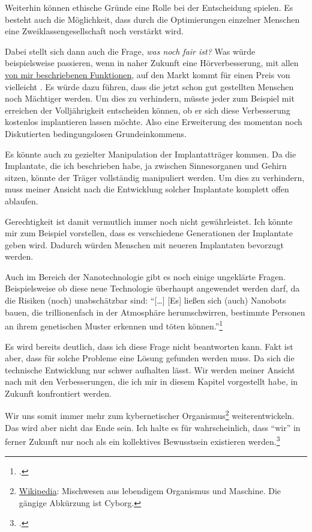Weiterhin können ethische Gründe eine Rolle bei der Entscheidung spielen. Es besteht auch die
Möglichkeit, dass durch die Optimierungen einzelner Menschen eine Zweiklassengesellschaft noch
verstärkt wird.

Dabei stellt sich dann auch die Frage, \emph{was noch fair ist?} Was würde beispielsweise passieren,
wenn in
naher Zukunft eine Hörverbesserung, mit allen \hyperref[sec:Robin:future:hearing]{von mir
beschriebenen Funktionen}, auf den Markt kommt für einen Preis von vielleicht . Es würde
dazu führen, dass die jetzt schon gut gestellten Menschen noch Mächtiger werden. Um dies zu
verhindern, müsste jeder zum Beispiel mit erreichen der Volljährigkeit entscheiden können, ob er sich
diese Verbesserung kostenlos implantieren lassen möchte. Also eine Erweiterung des momentan noch
Diskutierten bedingungslosen Grundeinkommens.

\begin{comment}
Eine weitere Frage ist, bis wann wir noch als Menschen zählen?
„Ist man noch ein Mensch, wenn man den Teil im Gehirn abgeschaltet hat, der für Schuldgefühle
zuständig ist?“\footcite{23C3:body_hacking}
\end{comment}

Es könnte auch zu gezielter Manipulation der Implantatträger kommen. Da die Implantate, die ich
beschrieben habe, ja zwischen Sinnesorganen und Gehirn sitzen, könnte der Träger vollständig
manipuliert werden. Um dies zu verhindern, muss meiner Ansicht nach die Entwicklung solcher
Implantate komplett offen ablaufen.

Gerechtigkeit ist damit vermutlich immer noch nicht gewährleistet. Ich könnte mir zum Beispiel
vorstellen, dass es verschiedene Generationen der Implantate geben wird. Dadurch würden Menschen mit
neueren Implantaten bevorzugt werden.

Auch im Bereich der Nanotechnologie gibt es noch einige ungeklärte Fragen. Beispielsweise ob diese
neue Technologie überhaupt angewendet werden darf, da die Risiken (noch) unabschätzbar sind:
\enquote{[\dots] [Es] ließen sich (auch) Nanobots bauen, die trillionenfach in der Atmosphäre
herumschwirren, bestimmte Personen an ihrem genetischen Muster erkennen und töten
können.}\footcite[13]{Heise:Telepolis:Mensch:Unsterblichkeit}

Es wird bereits deutlich, dass ich diese Frage nicht beantworten kann. Fakt ist aber, dass für solche
Probleme eine Lösung gefunden werden muss. Da sich die technische Entwicklung nur schwer aufhalten
lässt. Wir werden meiner Ansicht nach mit den Verbesserungen, die ich mir in diesem Kapitel
vorgestellt habe, in Zukunft konfrontiert werden.

Wir uns somit immer mehr zum kybernetischer
Organismus\footnote{\href{http://de.wikipedia.org/wiki/Cyborg}{Wikipedia}: Mischwesen aus lebendigem
Organismus und Maschine. Die gängige Abkürzung ist Cyborg.} weiterentwickeln.
Das wird aber nicht das Ende sein. Ich halte es für wahrscheinlich, dass \enquote{wir} in ferner
Zukunft nur noch als ein kollektives Bewusstsein
existieren werden.\footcite{Heise:Telepolis:Mensch:globales_Gehirn}
